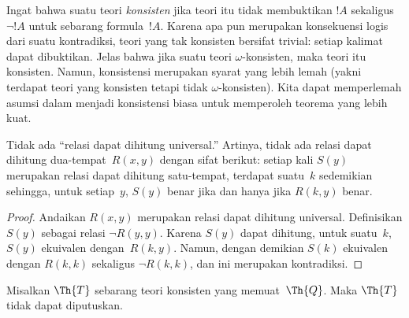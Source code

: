 \documentclass[../../../include/open-logic-section]{subfiles}
\begin{document}


\begin{explain}
Ingat bahwa suatu teori \emph{konsisten} jika teori itu tidak membuktikan
$!A$ sekaligus $\lnot !A$ untuk sebarang formula~$!A$. Karena apa pun
merupakan konsekuensi logis dari suatu kontradiksi, teori yang tak konsisten bersifat trivial:
setiap kalimat dapat dibuktikan. Jelas bahwa jika suatu teori
$\omega$-konsisten, maka teori itu konsisten. Namun, konsistensi merupakan
syarat yang lebih lemah (yakni terdapat teori yang konsisten tetapi tidak
$\omega$-konsisten). Kita dapat memperlemah asumsi dalam
 menjadi konsistensi biasa untuk memperoleh teorema
yang lebih kuat.
\end{explain}

\begin{lem}
Tidak ada ``relasi dapat dihitung universal.'' Artinya, tidak ada relasi
dapat dihitung dua-tempat~$R(x,y)$ dengan sifat berikut: setiap kali $S(y)$
merupakan relasi dapat dihitung satu-tempat, terdapat suatu~$k$ sedemikian
sehingga, untuk setiap~$y$, $S(y)$ benar jika dan hanya jika $R(k,y)$ benar.
\end{lem}

\begin{proof}
Andaikan $R(x,y)$ merupakan relasi dapat dihitung universal. Definisikan
$S(y)$ sebagai relasi $\lnot R(y,y)$. Karena $S(y)$ dapat dihitung, untuk suatu~$k$,
$S(y)$ ekuivalen dengan~$R(k,y)$. Namun, dengan demikian $S(k)$ ekuivalen
dengan $R(k,k)$ sekaligus $\lnot R(k,k)$, dan ini merupakan kontradiksi.
\end{proof}


\begin{thm}
Misalkan $\Th{T}$ sebarang teori konsisten yang memuat~$\Th{Q}$. Maka
$\Th{T}$ tidak dapat diputuskan.
\end{thm}
\end{document}
